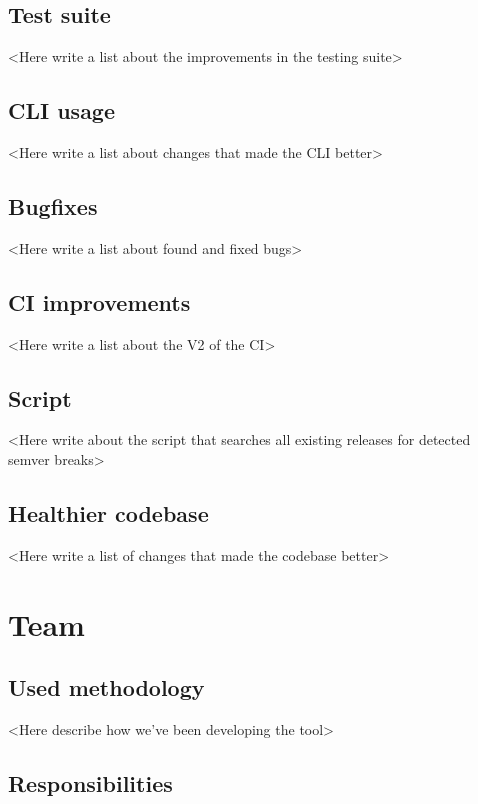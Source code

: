 \documentclass[licencjacka,en]{pracamgr}
\begin{document}
\section{Test suite}

<Here write a list about the improvements in the testing suite>


\section{CLI usage}

<Here write a list about changes that made the CLI better>


\section{Bugfixes}

<Here write a list about found and fixed bugs>


\section{CI improvements}

<Here write a list about the V2 of the CI>


\section{Script}

<Here write about the script that searches all existing releases for detected semver breaks>


\section{Healthier codebase}

<Here write a list of changes that made the codebase better>



\chapter{Team}\label{r:team}

\section{Used methodology}

<Here describe how we've been developing the tool>


\section{Responsibilities}
\end{document}
